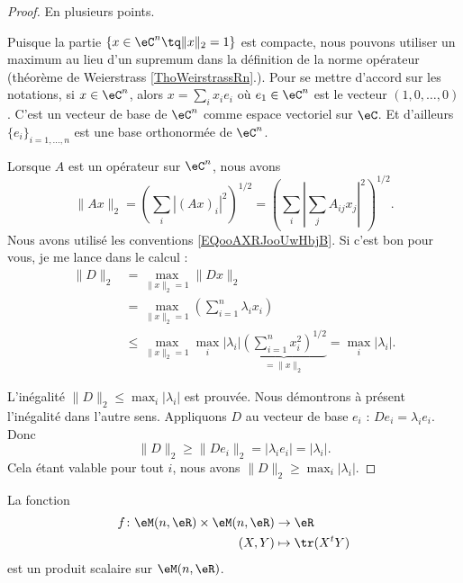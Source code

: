 \begin{proof}
	En plusieurs points.
	\begin{subproof}
		\spitem[Le compact]
		Puisque la partie \( \{ x\in \eC^n\tq \| x \|_2=1 \}\) est compacte, nous pouvons utiliser un maximum au lieu d'un supremum dans la définition de la norme opérateur (théorème de Weierstrass \ref{ThoWeirstrassRn}.).
		Pour se mettre d'accord sur les notations, si \( x\in \eC^n\), alors \( x=\sum_ix_ie_i\) où \( e_1\in \eC^n\) est le vecteur \( (1, 0,\ldots, 0)\). C'est un vecteur de base de \( \eC^n\) comme espace vectoriel sur \( \eC\). Et d'ailleurs \( \{ e_i \}_{i=1,\ldots, n}\) est une base orthonormée de \( \eC^n\).

		Lorsque \( A\) est un opérateur sur \( \eC^n\), nous avons
		\begin{equation}
			\| Ax \|_2=\left( \sum_i| (Ax)_i |^2 \right)^{1/2}
			=\left( \sum_i \left| \sum_jA_{ij}x_j \right|^2 \right)^{1/2}.
		\end{equation}
		Nous avons utilisé les conventions \eqref{EQooAXRJooUwHbjB}.
		\spitem[Le calcul]
		Si c'est bon pour vous, je me lance dans le calcul :
		\begin{subequations}
			\begin{align}
				\| D \|_2 & =\max_{\| x \|_2=1}\| Dx \|_2                                                                              \\
				          & =\max_{\| x \|_2=1}   \left( \sum_{i=1}^n\lambda_ix_i \right)                                              \\
				          & \leq \max_{\| x \|_2=1}\max_i| \lambda_i |\underbrace{\left( \sum_{i=1}^nx_i^2 \right)^{1/2}}_{=\| x \|_2}
				=\max_i| \lambda_i |.
			\end{align}
		\end{subequations}
	\end{subproof}
	L'inégalité \( \| D \|_2\leq \max_i| \lambda_i |\) est prouvée. Nous démontrons à présent l'inégalité dans l'autre sens. Appliquons \( D\) au vecteur de base \( e_i\) : \( De_i=\lambda_ie_i\). Donc
	\begin{equation}
		\| D \|_2\geq \| De_i \|_2=| \lambda_ie_i |=| \lambda_i |.
	\end{equation}
	Cela étant valable pour tout \( i\), nous avons \( \| D \|_2\geq\max_i| \lambda_i |\).
\end{proof}

\begin{proposition} \label{PropMAQoKAg}
	La fonction
	\begin{equation}
		\begin{aligned}
			f\colon \eM(n,\eR)\times \eM(n,\eR) & \to \eR           \\
			(X,Y)                               & \mapsto \tr(X^tY)
		\end{aligned}
	\end{equation}
	est un produit scalaire sur \( \eM(n,\eR)\).
\end{proposition}

